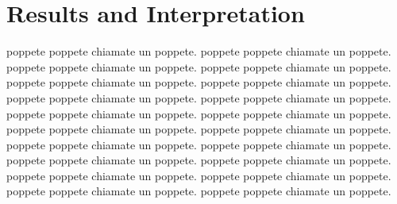 	\section{Results and Interpretation}
	\label{sec:results}

		poppete poppete chiamate un poppete. 		poppete poppete chiamate un poppete. 		poppete poppete chiamate un poppete. 		poppete poppete chiamate un poppete. 		poppete poppete chiamate un poppete. 		poppete poppete chiamate un poppete. 		poppete poppete chiamate un poppete. 		poppete poppete chiamate un poppete. 		poppete poppete chiamate un poppete. 		poppete poppete chiamate un poppete. 		poppete poppete chiamate un poppete. 		poppete poppete chiamate un poppete. 		poppete poppete chiamate un poppete. 		poppete poppete chiamate un poppete. 		poppete poppete chiamate un poppete. 		poppete poppete chiamate un poppete. 		poppete poppete chiamate un poppete. 		poppete poppete chiamate un poppete. 		poppete poppete chiamate un poppete. 		poppete poppete chiamate un poppete. 
